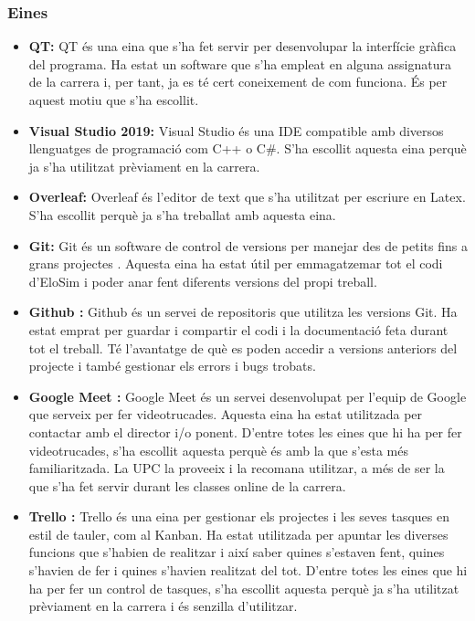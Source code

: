 \documentclass[a4paper]{article}
\begin{document}
\subsubsection{Eines}
\begin{itemize}
    \item \textbf{QT:} QT és una eina que s'ha fet servir per desenvolupar la interfície gràfica del programa. Ha estat un software que s'ha empleat en alguna assignatura de la carrera i, per tant, ja es té cert coneixement de com funciona. És per aquest motiu que s'ha escollit. 
    \item \textbf{Visual Studio 2019:} Visual Studio és una IDE compatible amb diversos llenguatges de programació com C++ o C\#. S'ha escollit aquesta eina perquè ja s'ha utilitzat prèviament en la carrera.  
    \item \textbf{Overleaf:} Overleaf és l'editor de text que s'ha utilitzat per escriure en Latex. S'ha escollit perquè ja s'ha treballat amb aquesta eina.
    \item \textbf{Git:} Git és un software de control de versions per manejar des de petits fins a grans projectes \cite{git}. Aquesta eina ha estat útil per emmagatzemar tot el codi d'EloSim i poder anar fent diferents versions del propi treball.
    \item \textbf{Github \cite{Github}:} Github és un servei de repositoris que utilitza les versions Git. Ha estat emprat per guardar i compartir el codi i la documentació feta durant tot el treball. Té l'avantatge de què es poden accedir a versions anteriors del projecte i també gestionar els errors i bugs trobats. 
    \item \textbf{Google Meet \cite{GoogleMeet}:} Google Meet és un servei desenvolupat per l'equip de Google que serveix per fer videotrucades. Aquesta eina ha estat utilitzada per contactar amb el director i/o ponent. D'entre totes les eines que hi ha per fer videotrucades, s'ha escollit aquesta perquè és amb la que s'esta més familiaritzada. La UPC la proveeix i la recomana utilitzar, a més de ser la que s'ha fet servir durant les classes online de la carrera.
    \item \textbf{Trello \cite{Trello}:} Trello és una eina per gestionar els projectes i les seves tasques en estil de tauler, com al Kanban. Ha estat utilitzada per apuntar les diverses funcions que s'habien de realitzar i així saber quines s'estaven fent, quines s'havien de fer i quines s'havien realitzat del tot. D'entre totes les eines que hi ha per fer un control de tasques, s'ha escollit aquesta perquè ja s'ha utilitzat prèviament en la carrera i és senzilla d'utilitzar.
\end{itemize}
\end{document}
